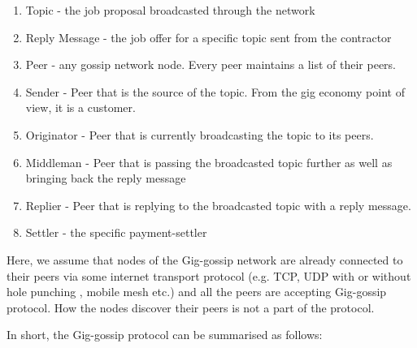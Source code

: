 \documentclass{article}
\begin{document}
\begin{enumerate}
	\item Topic - the job proposal broadcasted through the network
	\item Reply Message - the job offer for a specific topic sent from the contractor
	\item Peer - any gossip network node. Every peer maintains a list of their peers.
	\item Sender - Peer that is the source of the topic. From the gig economy point of view, it is a customer.
	\item Originator - Peer that is currently broadcasting the topic to its peers.
	\item Middleman - Peer that is passing the broadcasted topic further as well as bringing back the reply message
	\item Replier - Peer that is replying to the broadcasted topic with a reply message.
	\item Settler - the specific payment-settler
\end{enumerate}

Here, we assume that nodes of the Gig-gossip network are already connected to their peers via some internet transport protocol (e.g. TCP, UDP with or without hole punching \cite{WebRTC}, mobile mesh etc.) and all the peers are accepting Gig-gossip protocol. How the nodes discover their peers is not a part of the protocol.

In short, the Gig-gossip protocol can be summarised as follows:
\end{document}
